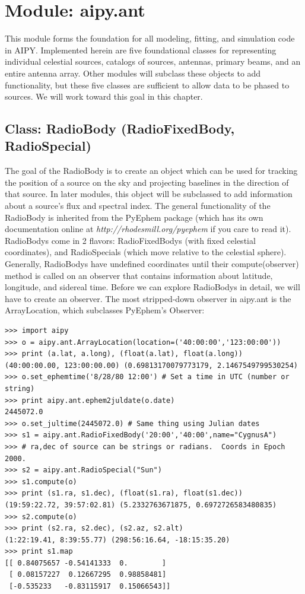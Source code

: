 \section{Module: aipy.ant}

This module forms the foundation for all modeling, fitting, and simulation code
in AIPY.  Implemented herein are five foundational classes for representing
individual celestial sources, catalogs of sources, antennas, primary beams,
and an entire antenna array.  Other modules will subclass these objects
to add functionality, but these five classes are sufficient to allow
data to be phased to sources.  We will work toward this goal in this chapter.

\subsection{Class: RadioBody (RadioFixedBody, RadioSpecial)}

The goal of the RadioBody is to create an object which can be used for
tracking the position of a source on the sky and projecting baselines in
the direction of that source.  In later modules, this object will be
subclassed to add information about a source's flux and spectral index.
The general functionality of the RadioBody is inherited from the PyEphem
package (which has its own documentation online at 
{\it http://rhodesmill.org/pyephem} if you care to read it).  
RadioBodys come
in 2 flavors: RadioFixedBodys (with fixed celestial coordinates), and
RadioSpecials (which move relative to the celestial sphere).  Generally,
RadioBodys have undefined coordinates until their compute(observer)
method is called on an observer that contains information about latitude, 
longitude, and sidereal time.  Before we can explore RadioBodys
in detail, we will have to create an observer. The most stripped-down 
observer in aipy.ant is the ArrayLocation, which subclasses PyEphem's Observer:

\begin{verbatim}
>>> import aipy
>>> o = aipy.ant.ArrayLocation(location=('40:00:00','123:00:00'))
>>> print (a.lat, a.long), (float(a.lat), float(a.long))
(40:00:00.00, 123:00:00.00) (0.69813170079773179, 2.1467549799530254)
>>> o.set_ephemtime('8/28/80 12:00') # Set a time in UTC (number or string)
>>> print aipy.ant.ephem2juldate(o.date)
2445072.0
>>> o.set_jultime(2445072.0) # Same thing using Julian dates
>>> s1 = aipy.ant.RadioFixedBody('20:00','40:00',name="CygnusA")
>>> # ra,dec of source can be strings or radians.  Coords in Epoch 2000.
>>> s2 = aipy.ant.RadioSpecial("Sun")
>>> s1.compute(o)
>>> print (s1.ra, s1.dec), (float(s1.ra), float(s1.dec))
(19:59:22.72, 39:57:02.81) (5.2332763671875, 0.6972726583480835)
>>> s2.compute(o)
>>> print (s2.ra, s2.dec), (s2.az, s2.alt)
(1:22:19.41, 8:39:55.77) (298:56:16.64, -18:15:35.20)
>>> print s1.map
[[ 0.84075657 -0.54141333  0.        ]
 [ 0.08157227  0.12667295  0.98858481]
 [-0.535233   -0.83115917  0.15066543]]
\end{verbatim}

